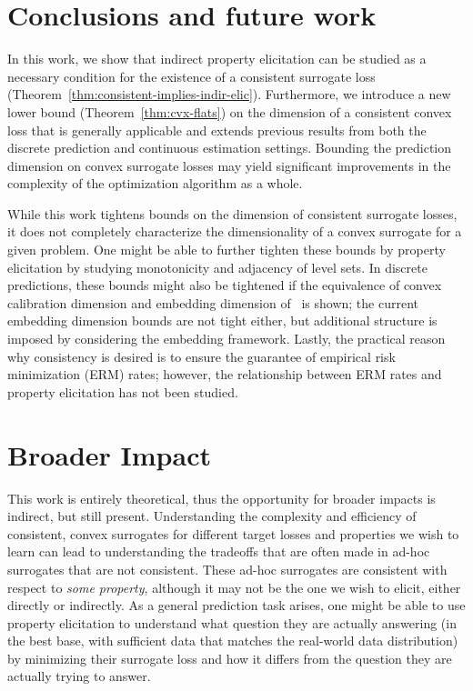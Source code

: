 \documentclass{article}
\begin{document}
\section{Conclusions and future work}\label{sec:conclusions}
In this work, we show that indirect property elicitation can be studied as a necessary condition for the existence of a consistent surrogate loss (Theorem~\ref{thm:consistent-implies-indir-elic}).
Furthermore, we introduce a new lower bound (Theorem~\ref{thm:cvx-flats}) on the dimension of a consistent convex loss that is generally applicable and extends previous results from both the discrete prediction and continuous estimation settings.
Bounding the prediction dimension on convex surrogate losses may yield significant improvements in the complexity of the optimization algorithm as a whole.

While this work tightens bounds on the dimension of consistent surrogate losses, it does not completely characterize the dimensionality of a convex surrogate for a given problem.
One might be able to further tighten these bounds by property elicitation by studying monotonicity and adjacency of level sets.
In discrete predictions, these bounds might also be tightened if the equivalence of convex calibration dimension and embedding dimension of~\citet{finocchiaro2020embedding} is shown; the current embedding dimension bounds are not tight either, but additional structure is imposed by considering the embedding framework.
Lastly, the practical reason why consistency is desired is to ensure the guarantee of empirical risk minimization (ERM) rates; however, the relationship between ERM rates and property elicitation has not been studied.


\newpage

\section*{Broader Impact}
This work is entirely theoretical, thus the opportunity for broader impacts is indirect, but still present.
Understanding the complexity and efficiency of consistent, convex surrogates for different target losses and properties we wish to learn can lead to understanding the tradeoffs that are often made in ad-hoc surrogates that are not consistent.
These ad-hoc surrogates are consistent with respect to \emph{some property}, although it may not be the one we wish to elicit, either directly or indirectly.
As a general prediction task arises, one might be able to use property elicitation to understand what question they are actually answering (in the best base, with sufficient data that matches the real-world data distribution) by minimizing their surrogate loss and how it differs from the question they are actually trying to answer.
\end{document}
